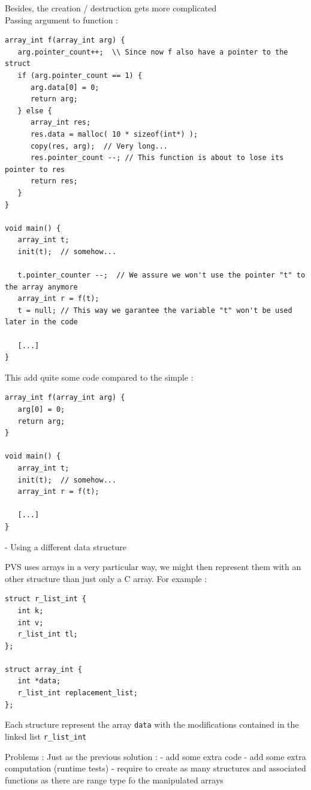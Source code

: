 \documentclass[12pt,a4paper,titlepage]{article}
\newcommand{\codeline}[1]{\texttt{#1}}
\begin{document}
Besides, the creation / destruction gets more complicated\\

Passing argument to function :
\begin{lstlisting}
array_int f(array_int arg) {
   arg.pointer_count++;  \\ Since now f also have a pointer to the struct
   if (arg.pointer_count == 1) {
      arg.data[0] = 0;
      return arg;
   } else {
      array_int res;
      res.data = malloc( 10 * sizeof(int*) );
      copy(res, arg);  // Very long...
      res.pointer_count --; // This function is about to lose its pointer to res
      return res;
   }
}

void main() {
   array_int t;
   init(t);  // somehow...
   
   t.pointer_counter --;  // We assure we won't use the pointer "t" to the array anymore
   array_int r = f(t);
   t = null; // This way we garantee the variable "t" won't be used later in the code
   
   [...]   
}
\end{lstlisting}

This add quite some code compared to the simple :

\begin{lstlisting}
array_int f(array_int arg) {
   arg[0] = 0;
   return arg;
}

void main() {
   array_int t;
   init(t);  // somehow...
   array_int r = f(t);
   
   [...]   
}
\end{lstlisting}



- Using a different data structure

PVS uses arrays in a very particular way, we might then represent them with an other structure than just only a C array.
For example :

\begin{lstlisting}
struct r_list_int {
   int k;
   int v;
   r_list_int tl;
};

struct array_int {
   int *data;
   r_list_int replacement_list;
};
\end{lstlisting}

Each structure represent the array \codeline{data} with the modifications contained in the linked list \codeline{r\_list\_int}

Problems : Just as the previous solution :
- add some extra code
- add some extra computation (runtime tests)
- require to create as many structures and associated functions as there are range type fo the manipulated arrays
\end{document}
